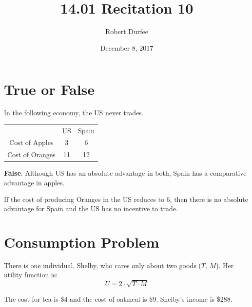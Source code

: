 \documentclass{article}
\title{ 14.01 Recitation 10 }
\author{ Robert Durfee }
\date{ December 8, 2017 }
\begin{document}
\maketitle

\section{ True or False }

In the following economy, the US never trades.
\begin{center}
    \begin{tabular}{ c c c }
        & US & Spain \\
        Cost of Apples & 3 & 6 \\
        Cost of Oranges & 11 & 12 \\
    \end{tabular}
\end{center}

\textbf{False}. Although US has an absolute advantage in both, Spain has
a comparative advantage in apples.

\bigbreak

If the cost of producing Oranges in the US reduces to 6, then there is
no absolute advantage for Spain and the US has no incentive to trade.

\section{ Consumption Problem }

There is one individual, Shelby, who cares only about two goods ($T$, $M$). Her
utility function is:
$$ U = 2 \cdot \sqrt{ T \cdot M } $$

The cost for tea is \$4 and the cost of oatmeal is \$9. Shelby's income is
\$288. 
\end{document}
